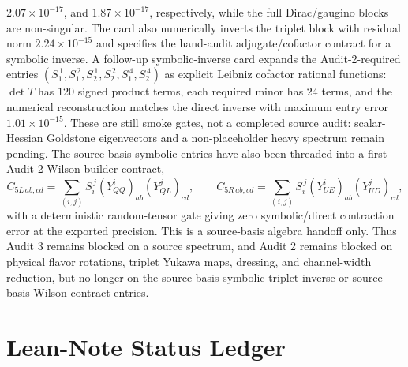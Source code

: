 \documentclass[
  aps,
  prd,
  preprint,
  nofootinbib,
  superscriptaddress,
  longbibliography
]{revtex4-2}
\begin{document}
\(2.07\times10^{-17}\), and \(1.87\times10^{-17}\), respectively, while the
full Dirac/gaugino blocks are non-singular.  The card also numerically inverts
the triplet block with residual norm \(2.24\times10^{-15}\) and specifies the
hand-audit adjugate/cofactor contract for a symbolic inverse.  A follow-up
symbolic-inverse card expands the Audit-2-required entries
\((S_1^{\,1},S_1^{\,2},S_2^{\,1},S_2^{\,2},S_1^{\,4},S_2^{\,4})\) as explicit
Leibniz cofactor rational functions: \(\det T\) has \(120\) signed product
terms, each required minor has \(24\) terms, and the numerical reconstruction
matches the direct inverse with maximum entry error \(1.01\times10^{-15}\).
These are still smoke gates, not a completed source audit: scalar-Hessian
Goldstone eigenvectors and a non-placeholder heavy spectrum remain pending.
The source-basis symbolic entries have also been threaded into a first Audit 2
Wilson-builder contract,
\[
  C_{5L\,ab,cd}=\sum_{(i,j)}S_i^{\,j}(Y_{QQ}^{i})_{ab}(Y_{QL}^{j})_{cd},
  \qquad
  C_{5R\,ab,cd}=\sum_{(i,j)}S_i^{\,j}(Y_{UE}^{i})_{ab}(Y_{UD}^{j})_{cd},
\]
with a deterministic random-tensor gate giving zero symbolic/direct
contraction error at the exported precision.  This is a source-basis algebra
handoff only.  Thus Audit 3 remains blocked on a source spectrum, and Audit 2
remains blocked on physical flavor rotations, triplet Yukawa maps, dressing,
and channel-width reduction, but no longer on the source-basis symbolic
triplet-inverse or source-basis Wilson-contract entries.

\section{Lean-Note Status Ledger}
\end{document}

